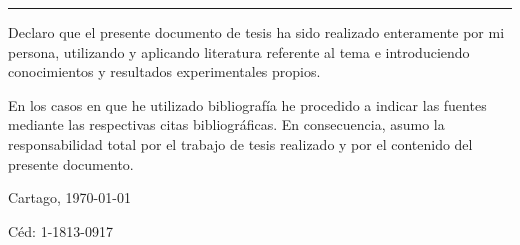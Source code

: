 \thispagestyle{empty}

\rule{10mm}{0pt}

\vfill

Declaro que el presente documento de tesis ha sido realizado enteramente
por mi persona, utilizando y aplicando literatura referente al tema e
introduciendo conocimientos y resultados experimentales propios.

En los casos en que he utilizado bibliografía he procedido a indicar las
fuentes mediante las respectivas citas bibliográficas.  En consecuencia,
asumo la responsabilidad total por el trabajo de tesis realizado y por
el contenido del presente documento.



\vspace*{8mm}

\begin{flushright}
  \thesisAuthor\par
  Cartago, \today\par
  Céd: 1-1813-0917
\end{flushright}

\cleardoublepage

